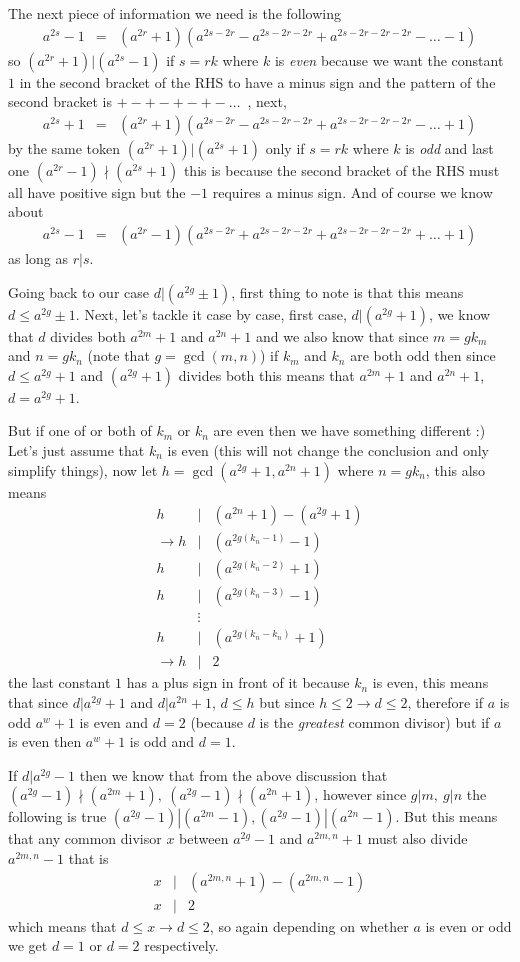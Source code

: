 \documentclass[aps,preprint,preprintnumbers,nofootinbib,showpacs,prd]{revtex4-1}
\newcommand{\nbea}{\begin{eqnarray*}}
\newcommand{\neea}{\end{eqnarray*}}
\begin{document}
The next piece of information we need is the following
%
\nbea
a^{2s} - 1 & = & (a^{2r} + 1)(a^{2s-2r} - a^{2s-2r-2r} + a^{2s - 2r - 2r - 2r} -  \ldots - 1)
\neea
%
so $(a^{2r} + 1)|(a^{2s} - 1)$ if $s = rk$ where $k$ is {\it even} because we want the constant $1$ in the second bracket of the RHS to have a minus sign and the pattern of the second bracket is $+-+-+-+-\ldots$~, next,
%
\nbea
a^{2s} + 1 & = & (a^{2r} + 1)(a^{2s-2r} - a^{2s-2r-2r} + a^{2s - 2r - 2r - 2r} -  \ldots + 1)
\neea
%
by the same token $(a^{2r} + 1)|(a^{2s} + 1)$ only if $s = rk$ where $k$ is {\it odd} and last one $(a^{2r} - 1)\nmid(a^{2s} + 1)$ this is because the second bracket of the RHS must all have positive sign but the $-1$ requires a minus sign. And of course we know about
%
\nbea
a^{2s} - 1 & = & (a^{2r} - 1)(a^{2s-2r} + a^{2s-2r-2r} + a^{2s - 2r - 2r - 2r} +  \ldots + 1)
\neea
%
as long as $r|s$.

Going back to our case $d|(a^{2g}\pm1)$, first thing to note is that this means $d \le a^{2g}\pm1$. Next, let's tackle it case by case, first case, $d|(a^{2g}+1)$, we know that $d$ divides both $a^{2m}+1$ and $a^{2n}+1$ and we also know that since $m = gk_m$ and $n = gk_n$ (note that $g = \gcd(m,n)$) if $k_m$ and $k_n$ are both odd then since $d \le a^{2g} + 1$ and $(a^{2g}+1)$ divides both this means that $a^{2m}+1$ and $a^{2n}+1$, $d = a^{2g}+1$.

But if one of or both of $k_m$ or $k_n$ are even then we have something different :) Let's just assume that $k_n$ is even (this will not change the conclusion and only simplify things), now let $h = \gcd(a^{2g}+1, a^{2n}+1)$ where $n=gk_n$, this also means
%
\nbea
h &|& (a^{2n}+1) - (a^{2g}+1) \\
\to h &|& (a^{2g(k_n-1)}-1) \\
h &|& (a^{2g(k_n-2)}+1) \\
h &|& (a^{2g(k_n-3)}-1) \\
&\vdots& \\
h &|& (a^{2g(k_n-k_n)}+1) \\
\to h &|& 2
\neea
%
the last constant $1$ has a plus sign in front of it because $k_n$ is even, this means that since $d|a^{2g}+1$ and $d|a^{2n}+1$, $d \le h$ but since $h \le 2 \to d \le 2$, therefore if $a$ is odd $a^{w} + 1$ is even and $d=2$ (because $d$ is the {\it greatest} common divisor) but if $a$ is even then $a^w+1$ is odd and $d=1$.

If $d|a^{2g}-1$ then we know that from the above discussion that $(a^{2g}-1)\nmid (a^{2m} + 1), ~(a^{2g}-1)\nmid (a^{2n} + 1)$, however since $g|m,~ g|n$ the following is true $(a^{2g}-1)| (a^{2m} - 1), (a^{2g}-1)| (a^{2n} - 1)$. But this means that any common divisor $x$ between $a^{2g}-1$ and $a^{2m,n}+1$ must also divide $a^{2m,n}-1$ that is
%
\nbea
x &|& (a^{2m,n}+1) - (a^{2m,n}-1) \\
x &|& 2
\neea
%
which means that $d \le x \to d \le 2$, so again depending on whether $a$ is even or odd we get $d=1$ or $d=2$ respectively.
\end{document}

